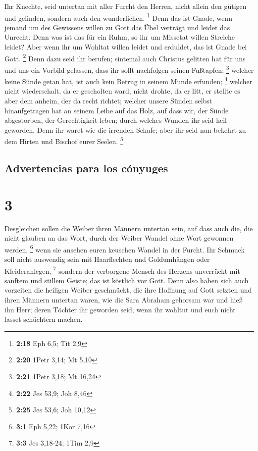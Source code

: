  Ihr Knechte, seid untertan mit aller Furcht den Herren,
nicht allein den gütigen und gelinden, sondern auch den wunderlichen.
\footnote{\textbf{2:18} Eph 6,5; Tit 2,9}  Denn das ist
Gnade, wenn jemand um des Gewissens willen zu Gott das Übel verträgt und
leidet das Unrecht.  Denn was ist das für ein Ruhm, so
ihr um Missetat willen Streiche leidet? Aber wenn ihr um Wohltat willen
leidet und erduldet, das ist Gnade bei Gott. \footnote{\textbf{2:20}
  1Petr 3,14; Mt 5,10}  Denn dazu seid ihr berufen;
sintemal auch Christus gelitten hat für uns und uns ein Vorbild
gelassen, dass ihr sollt nachfolgen seinen Fußtapfen; \footnote{\textbf{2:21}
  1Petr 3,18; Mt 16,24}  welcher keine Sünde getan hat,
ist auch kein Betrug in seinem Munde erfunden; \footnote{\textbf{2:22}
  Jes 53,9; Joh 8,46}  welcher nicht wiederschalt, da er
gescholten ward, nicht drohte, da er litt, er stellte es aber dem
anheim, der da recht richtet;  welcher unsere Sünden
selbst hinaufgetragen hat an seinem Leibe auf das Holz, auf dass wir,
der Sünde abgestorben, der Gerechtigkeit leben; durch welches Wunden ihr
seid heil geworden.  Denn ihr waret wie die irrenden
Schafe; aber ihr seid nun bekehrt zu dem Hirten und Bischof eurer
Seelen. \footnote{\textbf{2:25} Jes 53,6; Joh 10,12}

\hypertarget{advertencias-para-los-cuxf3nyuges}{%
\subsection{Advertencias para los
cónyuges}\label{advertencias-para-los-cuxf3nyuges}}

\hypertarget{section-2}{%
\section{3}\label{section-2}}

 Desgleichen sollen die Weiber ihren Männern untertan
sein, auf dass auch die, die nicht glauben an das Wort, durch der Weiber
Wandel ohne Wort gewonnen werden, \footnote{\textbf{3:1} Eph 5,22; 1Kor
  7,16}  wenn sie ansehen euren keuschen Wandel in der
Furcht.  Ihr Schmuck soll nicht auswendig sein mit
Haarflechten und Goldumhängen oder Kleideranlegen, \footnote{\textbf{3:3}
  Jes 3,18-24; 1Tim 2,9}  sondern der verborgene Mensch
des Herzens unverrückt mit sanftem und stillem Geiste; das ist köstlich
vor Gott.  Denn also haben sich auch vorzeiten die
heiligen Weiber geschmückt, die ihre Hoffnung auf Gott setzten und ihren
Männern untertan waren,  wie die Sara Abraham gehorsam war
und hieß ihn Herr; deren Töchter ihr geworden seid, wenn ihr wohltut und
euch nicht lasset schüchtern machen.

